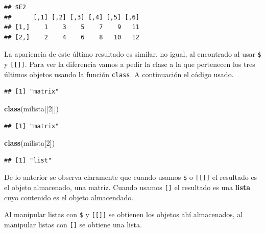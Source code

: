 \documentclass[10pt,]{krantz}
\makeatletter
\newenvironment{Shaded}{\begin{snugshade}}{\end{snugshade}}
\newcommand{\KeywordTok}[1]{\textcolor[rgb]{0.13,0.29,0.53}{\textbf{{#1}}}}
\newcommand{\DecValTok}[1]{\textcolor[rgb]{0.00,0.00,0.81}{{#1}}}
\newcommand{\NormalTok}[1]{{#1}}
\newenvironment{kframe}{%
\medskip{}
\setlength{\fboxsep}{.8em}
 \def\at@end@of@kframe{}%
 \ifinner\ifhmode%
  \def\at@end@of@kframe{\end{minipage}}%
  \begin{minipage}{\columnwidth}%
 \fi\fi%
 \def\FrameCommand##1{\hskip\@totalleftmargin \hskip-\fboxsep
 \colorbox{shadecolor}{##1}\hskip-\fboxsep
     \hskip-\linewidth \hskip-\@totalleftmargin \hskip\columnwidth}%
 \MakeFramed {\advance\hsize-\width
   \@totalleftmargin\z@ \linewidth\hsize
   \@setminipage}}%
 {\par\unskip\endMakeFramed%
 \at@end@of@kframe}
\renewenvironment{Shaded}{\begin{kframe}}{\end{kframe}}
\let\BeginKnitrBlock\begin \let\EndKnitrBlock\end
\makeatother
\begin{document}
\begin{verbatim}
## $E2
##      [,1] [,2] [,3] [,4] [,5] [,6]
## [1,]    1    3    5    7    9   11
## [2,]    2    4    6    8   10   12
\end{verbatim}

La apariencia de este último resultado es similar, no igual, al
encontrado al usar \texttt{\$} y \texttt{{[}{[}{]}{]}}. Para ver la
diferencia vamos a pedir la clase a la que pertenecen los tres últimos
objetos usando la función \texttt{class}. A continuación el código
usado.

\begin{Shaded}
\end{Shaded}

\begin{verbatim}
## [1] "matrix"
\end{verbatim}

\begin{Shaded}
\begin{Highlighting}[]
\KeywordTok{class}\NormalTok{(milista[[}\DecValTok{2}\NormalTok{]])}
\end{Highlighting}
\end{Shaded}

\begin{verbatim}
## [1] "matrix"
\end{verbatim}

\begin{Shaded}
\begin{Highlighting}[]
\KeywordTok{class}\NormalTok{(milista[}\DecValTok{2}\NormalTok{])}
\end{Highlighting}
\end{Shaded}

\begin{verbatim}
## [1] "list"
\end{verbatim}

De lo anterior se observa claramente que cuando usamos \texttt{\$} o
\texttt{{[}{[}{]}{]}} el resultado es el objeto almacenado, una matriz.
Cuando usamos \texttt{{[}{]}} el resultado es una \textbf{lista} cuyo
contenido es el objeto almacendado.

\BeginKnitrBlock{rmdwarning}
Al manipular listas con \texttt{\$} y \texttt{{[}{[}{]}{]}} se obtienen
los objetos ahí almacenados, al manipular listas con \texttt{{[}{]}} se
obtiene una lista.
\EndKnitrBlock{rmdwarning}
\end{document}
